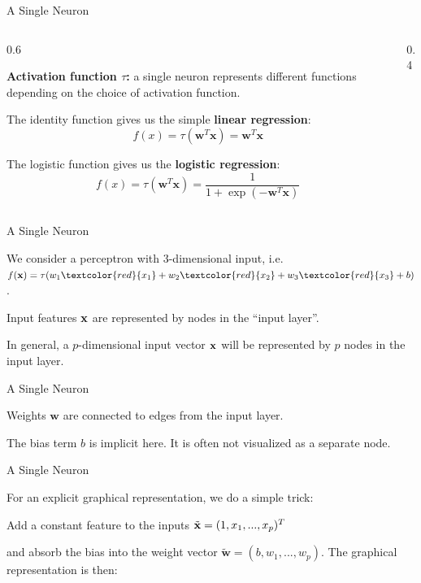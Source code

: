 \documentclass[11pt,compress,t,notes=noshow, xcolor=table]{beamer}
\begin{document}
\begin{framei}{A Single Neuron}
\begin{columns}
\begin{column}{0.6\textwidth}
\item \textbf{Activation function $\tau$:} a single neuron represents different functions depending on the choice of activation function.
\item The identity function gives us the simple \textbf{linear regression}:
$$f(x) = \tau(\mathbf{w}^T \mathbf{x}) = \mathbf{w}^T \mathbf{x}$$
\item The logistic function gives us the \textbf{logistic regression}:
$$f(x) = \tau(\mathbf{w}^T \mathbf{x}) = \frac{1}{1 + \exp(-\mathbf{w}^T \mathbf{x})}$$
\end{column}
\begin{column}{0.4\textwidth}
\begin{center}
\end{center}
\end{column}
\end{columns}
\end{framei}

\begin{framei} {A Single Neuron}
\item We consider a perceptron with $3$-dimensional input, i.e. $\fx = \tau(w_1\textcolor{red}{x_1} + w_2\textcolor{red}{x_2} + w_3\textcolor{red}{x_3} + b)$.
\item %
Input features $\mathbf{x}$ are represented by nodes in the \enquote{input layer}.
\item In general, a $p$-dimensional input vector $\mathbf{x}$ will be represented by $p$ nodes in the input layer.
\end{framei}

\begin{framei} {A Single Neuron}
\item Weights $\mathbf{w}$ are connected to edges from the input layer.
\item The bias term $b$ is implicit here. It is often not visualized as a separate node.
\end{framei}

\begin{framei} {A Single Neuron}
\item For an explicit graphical representation, we do a simple trick: 
\item Add a constant feature to the inputs $\tilde{\mathbf{x}} = (1, x_1, ..., x_p)^T$
\item and absorb the bias into the weight vector $\tilde{\bm{w}} = (b, w_1, ..., w_p)$.
The graphical representation is then: 
\end{framei}
\end{document}
